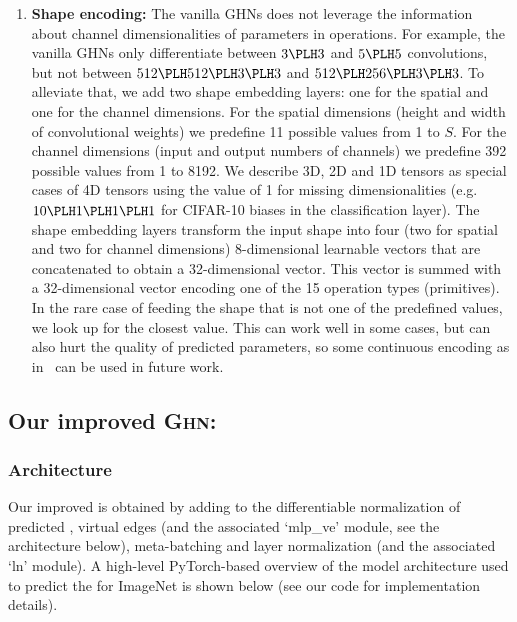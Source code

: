 \begin{enumerate}
	\item \textbf{Shape encoding:} The vanilla GHNs does not leverage the information about channel dimensionalities  of parameters in operations. For example, the vanilla GHNs only differentiate between $3\PLH 3$ and $5\PLH 5$ convolutions, but not between $512 \PLH 512 \PLH 3\PLH 3$ and $512 \PLH 256 \PLH 3\PLH 3$.
	To alleviate that, we add two shape embedding layers: one for the spatial and one for the channel dimensions.
	For the spatial dimensions (height and width of convolutional weights) we predefine 11 possible values from 1 to $S$. 
	For the channel dimensions (input and output numbers of channels) we predefine 392 possible values from 1 to 8192. We describe 3D, 2D and 1D tensors as special cases of 4D tensors using the value of 1 for missing dimensionalities (e.g. $10\PLH1\PLH1\PLH1$ for CIFAR-10 biases in the classification layer). The shape embedding layers transform the input shape into four (two for spatial and two for channel dimensions) 8-dimensional learnable vectors that are concatenated to obtain a 32-dimensional vector. This vector is summed with a 32-dimensional vector encoding one of the 15 operation types (primitives). In the rare case of feeding the shape that is not one of the predefined values, we look up for the closest value. This can work well in some cases, but can also hurt the quality of predicted parameters, so some continuous encoding as in~\cite{vaswani2017attention} can be used in future work.
\end{enumerate}


\subsection{Our improved \textsc{Ghn}: \ghnours\label{apdx:ghn_2}}

\subsubsection{\ghnours Architecture}
Our improved \ghnours is obtained by adding to \ghnbase the differentiable normalization of predicted \params, virtual edges (and the associated `mlp\_ve' module, see the architecture below), meta-batching and layer normalization (and the associated `ln' module). A high-level PyTorch-based overview of the \ghnours model architecture used to predict the \params for ImageNet is shown below (see our code for implementation details).


\vspace{15pt}

